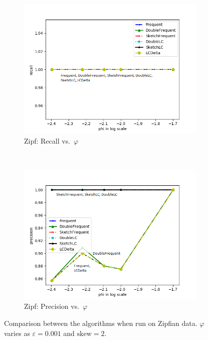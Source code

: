 \documentclass[sigconf,review=true,anonymous=true,screen]{acmart}
\newcommand{\eps}{\varepsilon}
\renewcommand{\phi}{\varphi}
\begin{document}
\begin{figure}
\begin{subfigure}[b]{0.3\textwidth}
\includegraphics[width=\textwidth]{../Plots/recall_phiskew.png}
\caption{Zipf: Recall vs.~$\phi$}
\end{subfigure}
~
\begin{subfigure}[b]{0.3\textwidth}
\includegraphics[width=\textwidth]{../Plots/precision_phiskew.png}
\caption{Zipf: Precision vs.~$\phi$}
\end{subfigure}
\caption{Comparison between the algorithms when run on Zipfian data. $\phi$ varies as $\eps = 0.001$ and $\text{skew} = 2$.}
\end{figure}
\end{document}
